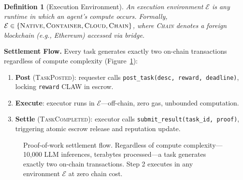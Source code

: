 \documentclass{article}
\newtheorem{definition}{Definition}
\begin{document}
\begin{definition}[Execution Environment]
An execution environment $\mathcal{E}$ is any runtime in which an agent's compute occurs. Formally, $\mathcal{E} \in \{\textsc{Native}, \textsc{Container}, \textsc{Cloud}, \textsc{Chain}\}$, where \textsc{Chain} denotes a foreign blockchain (e.g., Ethereum) accessed via bridge.
\end{definition}

\noindent\textbf{Settlement Flow.} Every task generates exactly two on-chain transactions regardless of compute complexity (Figure~\ref{fig:settlement}):

\begin{enumerate}
    \item \textbf{Post} (\textsc{TaskPosted}): requester calls \texttt{post\_task(desc, reward, deadline)}, locking \texttt{reward} CLAW in escrow.
    \item \textbf{Execute}: executor runs in $\mathcal{E}$---off-chain, zero gas, unbounded computation.
    \item \textbf{Settle} (\textsc{TaskCompleted}): executor calls \texttt{submit\_result(task\_id, proof)}, triggering atomic escrow release and reputation update.
\end{enumerate}

\begin{figure}[t]
\centering
{}
\caption{Proof-of-work settlement flow. Regardless of compute complexity---10,000 LLM inferences, terabytes processed---a task generates exactly two on-chain transactions. Step 2 executes in any environment $\mathcal{E}$ at zero chain cost.}
\label{fig:settlement}
\end{figure}
\end{document}

